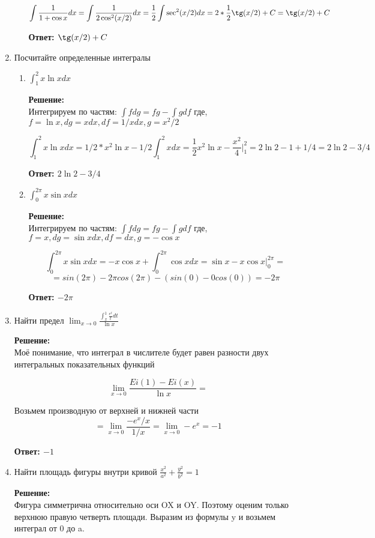 \documentclass[a4paper,12pt]{article}
\begin{document}
\begin{enumerate}
\begin{enumerate}
$$\int\frac{1}{1+\cos x} dx = \int\frac{1}{2\cos^2 (x/2)} dx=\frac{1}{2} \int\sec^2 (x/2) dx = 2*\frac{1}{2} \tg(x/2) + C =  \tg(x/2) + C$$

\textbf{Ответ: $\tg(x/2) + C$}
\end{enumerate}

\item Посчитайте определенные интегралы
\begin{enumerate}
\item 
$
\int^2_1 x \ln x dx
$

\textbf{Решение:}\\
Интегрируем по частям:
$\int f dg = fg - \int gdf$ где, $f = \ln x, dg = xdx, df = 1/x dx, g = x^2 / 2$

$$
\int^2_1 x \ln x dx = 1/2*x^2 \ln x - 1/2 \int^2_1  x dx = \frac{1}{2} x^2 \ln x - \frac{x^2}{4}\Biggr|_{1}^{2} = 2\ln2 - 1 + 1/4 = 2\ln2 -3/4
$$

\textbf{Ответ: $2\ln2 -3/4$}

\item 
$
\int^{2\pi}_0 x \sin x dx
$

\textbf{Решение:}\\
Интегрируем по частям:
$\int f dg = fg - \int gdf$ где, $f =  x, dg = \sin x dx, df = dx, g = -\cos x$

$$
\int^{2\pi}_0 x \sin x dx
 = -x \cos x + \int^{2\pi}_0  \cos x dx = \sin{x} -x \cos{x}\Biggr|_{0}^{2\pi} =
$$
$$= sin(2\pi) - 2\pi cos(2\pi) - (sin(0) - 0 cos(0) ) = -2\pi$$

\textbf{Ответ: $-2\pi$}


\end{enumerate}

\item Найти предел $\lim_{x \to 0 }\frac{\int_{x}^{1} \frac{e^t}{t} dt}{\ln x}$

\textbf{Решение:}\\
Моё понимание, что интеграл в числителе будет равен разности двух интегральных показательных функций

$$
\lim_{x \to 0 }\frac{Ei(1) - Ei(x)}{\ln x}=
$$

Возьмем производную от верхней и нижней части 
$$= \lim_{x \to 0 }\frac{-e^x / x}{1/x} =\lim_{x \to 0 }-e^x = -1 $$

\textbf{Ответ: $-1$}

\item Найти площадь фигуры внутри кривой $\frac{x^2}{a^2}+\frac{y^2}{b^2}=1$

\textbf{Решение:}\\
Фигура симметрична относительно оси OX и OY. Поэтому оценим только верхнюю правую четверть площади. Выразим из формулы y и возьмем интеграл от 0 до a.


\end{enumerate}
\end{document}
